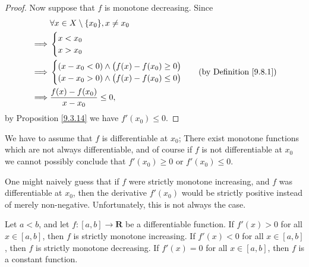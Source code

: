 \begin{proof}
    Now suppose that \(f\) is monotone decreasing.
    Since
    \begin{align*}
                 & \forall x \in X \setminus \{x_0\}, x \neq x_0      \\
        \implies & \begin{cases}
                       x < x_0 \\
                       x > x_0 \\
                   \end{cases}                                       \\
        \implies & \begin{cases}
                       (x - x_0 < 0) \land \big(f(x) - f(x_0) \geq 0\big) \\
                       (x - x_0 > 0) \land \big(f(x) - f(x_0) \leq 0\big) \\
                   \end{cases} & \text{(by Definition \ref{9.8.1})} \\
        \implies & \frac{f(x) - f(x_0)}{x - x_0} \leq 0,
    \end{align*}
    by Proposition \ref{9.3.14} we have \(f'(x_0) \leq 0\).
\end{proof}

\begin{remark}\label{10.3.2}
    We have to assume that \(f\) is differentiable at \(x_0\);
    There exist monotone functions which are not always differentiable, and of course if \(f\) is not differentiable at \(x_0\) we cannot possibly conclude that \(f'(x_0) \geq 0\) or \(f'(x_0) \leq 0\).
\end{remark}

\begin{note}
    One might naively guess that if \(f\) were strictly monotone increasing, and \(f\) was differentiable at \(x_0\), then the derivative \(f'(x_0)\) would be strictly positive instead of merely non-negative.
    Unfortunately, this is not always the case.
\end{note}

\begin{proposition}\label{10.3.3}
    Let \(a < b\), and let \(f : [a, b] \to \mathbf{R}\) be a differentiable function.
    If \(f'(x) > 0\) for all \(x \in [a, b]\), then \(f\) is strictly monotone increasing.
    If \(f'(x) < 0\) for all \(x \in [a, b]\), then \(f\) is strictly monotone decreasing.
    If \(f'(x) = 0\) for all \(x \in [a, b]\), then \(f\) is a constant function.
\end{proposition}


